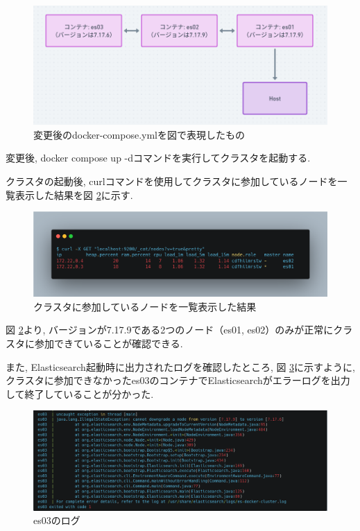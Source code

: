 \begin{figure}
  \begin{center}
    \includegraphics[width=120mm]{sotu/figure/2-7.19.9-and-1-7.17.6.png}
    \caption{変更後のdocker-compose.ymlを図で表現したもの}
    \label{4-p5}
  \end{center}
\end{figure}

変更後, docker compose up -dコマンドを実行してクラスタを起動する.

クラスタの起動後, curlコマンドを使用してクラスタに参加しているノードを一覧表示した結果を図 \ref{4-p6}に示す.

\begin{figure}
  \begin{center}
    \includegraphics[width=120mm]{sotu/figure/curl-different.png}
    \caption{クラスタに参加しているノードを一覧表示した結果}
    \label{4-p6}
  \end{center}
\end{figure}

図 \ref{4-p6}より, バージョンが7.17.9である2つのノード（es01, es02）のみが正常にクラスタに参加できていることが確認できる.

また, Elasticsearch起動時に出力されたログを確認したところ, 図 \ref{4-p7}に示すように, クラスタに参加できなかったes03のコンテナでElasticsearchがエラーログを出力して終了していることが分かった.

\begin{figure}
  \begin{center}
    \includegraphics[width=120mm]{sotu/figure/log.png}
    \caption{es03のログ}
    \label{4-p7}
  \end{center}
\end{figure}

